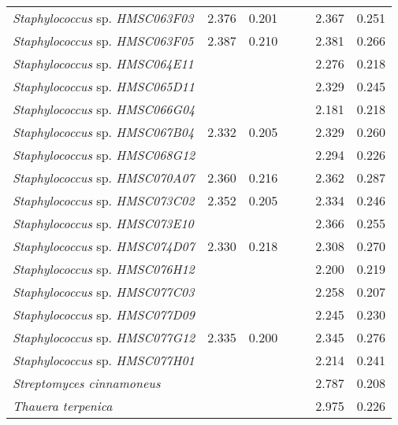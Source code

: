 \begin{longtable}{l|rr|rr|rr}
\textit{Staphylococcus} sp. \textit{HMSC063F03} & 2.376 & 0.201 &  &  & 2.367 & 0.251 \\
\textit{Staphylococcus} sp. \textit{HMSC063F05} & 2.387 & 0.210 &  &  & 2.381 & 0.266 \\
\textit{Staphylococcus} sp. \textit{HMSC064E11} &  &  &  &  & 2.276 & 0.218 \\
\textit{Staphylococcus} sp. \textit{HMSC065D11} &  &  &  &  & 2.329 & 0.245 \\
\textit{Staphylococcus} sp. \textit{HMSC066G04} &  &  &  &  & 2.181 & 0.218 \\
\textit{Staphylococcus} sp. \textit{HMSC067B04} & 2.332 & 0.205 &  &  & 2.329 & 0.260 \\
\textit{Staphylococcus} sp. \textit{HMSC068G12} &  &  &  &  & 2.294 & 0.226 \\
\textit{Staphylococcus} sp. \textit{HMSC070A07} & 2.360 & 0.216 &  &  & 2.362 & 0.287 \\
\textit{Staphylococcus} sp. \textit{HMSC073C02} & 2.352 & 0.205 &  &  & 2.334 & 0.246 \\
\textit{Staphylococcus} sp. \textit{HMSC073E10} &  &  &  &  & 2.366 & 0.255 \\
\textit{Staphylococcus} sp. \textit{HMSC074D07} & 2.330 & 0.218 &  &  & 2.308 & 0.270 \\
\textit{Staphylococcus} sp. \textit{HMSC076H12} &  &  &  &  & 2.200 & 0.219 \\
\textit{Staphylococcus} sp. \textit{HMSC077C03} &  &  &  &  & 2.258 & 0.207 \\
\textit{Staphylococcus} sp. \textit{HMSC077D09} &  &  &  &  & 2.245 & 0.230 \\
\textit{Staphylococcus} sp. \textit{HMSC077G12} & 2.335 & 0.200 &  &  & 2.345 & 0.276 \\
\textit{Staphylococcus} sp. \textit{HMSC077H01} &  &  &  &  & 2.214 & 0.241 \\
\textit{Streptomyces cinnamoneus} &  &  &  &  & 2.787 & 0.208 \\
\textit{Thauera terpenica} &  &  &  &  & 2.975 & 0.226
\end{longtable}
